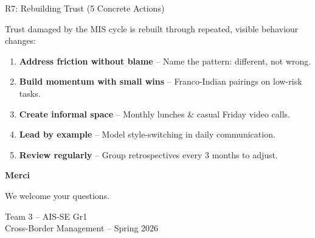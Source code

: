 \documentclass[aspectratio=169, 12pt]{beamer}
\newcommand{\presenter}[1]{\gdef\currentpresenter{#1}}
\gdef\currentpresenter{}
\begin{document}
\begin{frame}{R7: Rebuilding Trust (5 Concrete Actions)}
\presenter{Presenter: Arihant JAIN}

\vspace{0.3em}

Trust damaged by the MIS cycle is rebuilt through repeated, visible behaviour changes:

\vspace{0.5em}

\begin{enumerate}
    \item \textbf{Address friction without blame} -- Name the pattern: different, not wrong.
    \item \textbf{Build momentum with small wins} -- Franco-Indian pairings on low-risk tasks.
    \item \textbf{Create informal space} -- Monthly lunches \& casual Friday video calls.
    \item \textbf{Lead by example} -- Model style-switching in daily communication.
    \item \textbf{Review regularly} -- Group retrospectives every 3 months to adjust.
\end{enumerate}

\end{frame}

{
\begin{frame}{}

\vspace{2cm}

\begin{center}
{\Large \textbf{Merci}}

\vspace{1cm}

{\large We welcome your questions.}

\vspace{1.5cm}

{\small Team 3 -- AIS-SE Gr1\\Cross-Border Management -- Spring 2026}
\end{center}

\end{frame}
}
\end{document}
